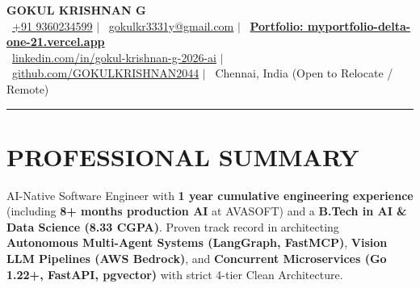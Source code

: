 \documentclass[letterpaper,10pt]{article}
\begin{document}
\begin{center}
  {\Huge\textbf{\color{accentblue}GOKUL KRISHNAN G}}\\[2.5pt]
  \small\color{darkgray}
  \ \href{tel:+919360234599}{+91 9360234599} \enspace$|$\enspace
  \ \href{mailto:gokulkr3331y@gmail.com}{gokulkr3331y@gmail.com} \enspace$|$\enspace
  \ \href{https://myportfolio-delta-one-21.vercel.app/}{\textbf{\color{accentblue}Portfolio: myportfolio-delta-one-21.vercel.app}} \\[2.5pt]
  \ \href{https://www.linkedin.com/in/gokul-krishnan-g-2026-ai/}{linkedin.com/in/gokul-krishnan-g-2026-ai} \enspace$|$\enspace
  \ \href{https://github.com/GOKULKRISHNAN2044}{github.com/GOKULKRISHNAN2044} \enspace$|$\enspace
  \ Chennai, India (Open to Relocate / Remote)
\end{center}
\vspace{-2pt}
{\color{accentblue}\rule{\linewidth}{1.2pt}}
\vspace{1.5pt}

\section{PROFESSIONAL SUMMARY}
\small{AI-Native Software Engineer with \textbf{1 year cumulative engineering experience} (including \textbf{8+ months production AI} at AVASOFT) and a \textbf{B.Tech in AI \& Data Science (8.33 CGPA)}. Proven track record in architecting \textbf{Autonomous Multi-Agent Systems (LangGraph, FastMCP)}, \textbf{Vision LLM Pipelines (AWS Bedrock)}, and \textbf{Concurrent Microservices (Go 1.22+, FastAPI, pgvector)} with strict 4-tier Clean Architecture.}

\end{document}
